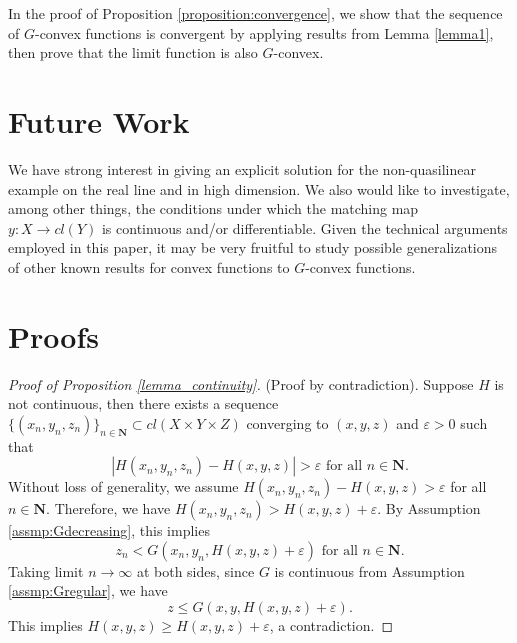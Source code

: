 \documentclass[a4paper, 11pt]{amsart}
\numberwithin{equation}{section}
\theoremstyle{plain}
\theoremstyle{definition}
\theoremstyle{remark}
\newcommand{\N}{\mathbf{N}}
\begin{document}
In the proof of Proposition \ref{proposition:convergence}, we show that the sequence of $G$-convex functions is convergent by applying results from Lemma \ref{lemma1}, then prove that the limit function is also $G$-convex. \medskip



\bigskip





\section{Future Work}\label{section:futurework}

We have strong interest in giving an explicit solution for the non-quasilinear example on the real line and in high dimension. We also would like to investigate, among other things, the conditions under which the matching map $y: X \rightarrow cl(Y)$ is continuous and/or differentiable. Given the technical arguments employed in this paper, it may be very fruitful to study possible generalizations of other known results for convex functions to $G$-convex functions.




\bigskip



\section{Proofs}\label{section:proofs}

\begin{proof}[Proof of Proposition \ref{lemma_continuity}]
	(Proof by contradiction). Suppose $H$ is not continuous, then there exists a sequence $\{(x_n, y_n, z_n)\}_{n\in \N} \subset cl(X\times Y \times Z)$ converging to $(x, y, z)$ and $\varepsilon >0$ such that 
	$$|H(x_n, y_n, z_n) - H(x,y,z)|>\varepsilon \text{ for all $n\in \N$}.$$ 
	Without loss of generality, we assume $H(x_n, y_n, z_n) - H(x,y,z)>\varepsilon$ for all $n\in \N$. Therefore, we have $H(x_n, y_n, z_n) > H(x,y,z)+\varepsilon$. By Assumption \ref{assmp:Gdecreasing}, this implies 
	$$z_n < G(x_n, y_n, H(x,y,z)+\varepsilon) \text{ for all $n\in \N$.}$$ 
	Taking limit $n\rightarrow \infty$ at both sides, since $G$ is continuous from Assumption \ref{assmp:Gregular}, we have 
	$$z \le G(x, y, H(x,y,z)+\varepsilon).$$ This implies $H(x,y,z) \ge H(x,y,z)+\varepsilon$, a contradiction.
\end{proof}

\vspace{0.3cm}
\end{document}
